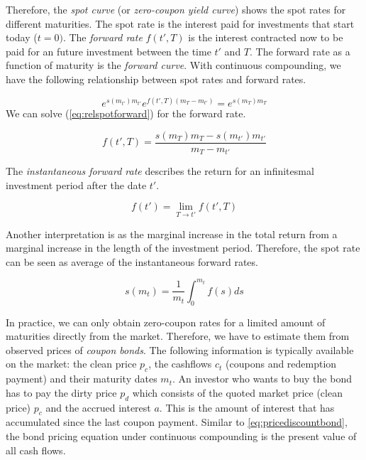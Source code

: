 Therefore, the \emph{spot curve} (or \emph{zero-coupon yield curve}) shows the spot rates for different maturities. The spot rate is the interest paid for investments that start today ($t=0)$. The \emph{forward rate} $f(t',T)$ is the interest contracted now to be paid for an future investment between the time $t'$ and $T$. The forward rate as a function of maturity is the \emph{forward curve}. With continuous compounding, we have the following relationship between spot rates and forward rates.

\begin{equation}
  \label{eq:relspotforward}
  e^{s(m_{t'}) m_{t'}}e^{f(t',T)(m_T-m_{t'})} = e^{s(m_T) m_T}
\end{equation}
We can solve (\ref{eq:relspotforward}) for the forward rate.

\begin{equation}
  \label{eq:forwardrate}
  f(t',T) = \frac{s(m_T)m_T - s(m_{t'})m_{t'}}{m_T-m_{t'}}
\end{equation}

The \emph{instantaneous forward rate} describes the return for an infinitesmal investment period after the date $t'$.

\begin{equation}
  \label{eq:instforw}
  f(t') = \lim_{T\rightarrow t'}f(t',T)
\end{equation}

Another interpretation is as the marginal increase in the total return from a marginal increase in the length of the investment period. Therefore, the spot rate can be seen as average of the instantaneous forward rates.

\begin{equation}
  \label{eq:avgforwardrate}
  s(m_t)=\frac{1}{m_t}\int_0^{m_t}f(s)ds
\end{equation}

In practice, we can only obtain zero-coupon rates for a limited amount of maturities directly from the market. Therefore, we have to estimate them from observed prices of \emph{coupon bonds}. The following information is typically available on the market: the clean price $p_c$, the cashflows $c_t$ (coupons and redemption payment) and their maturity dates $m_t$. An investor who wants to buy the bond has to pay the dirty price $p_d$ which consists of the quoted market price (clean price) $p_c$ and the accrued interest $a$. This is the amount of interest that has accumulated since the last coupon payment. Similar to \eqref{eq:pricediscountbond}, the bond pricing equation under continuous compounding is the present value of all cash flows.


